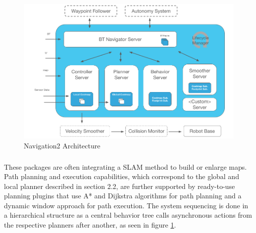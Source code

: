 \begin{figure}[ht]
	\label{fig:nav_architecture}
	\includegraphics[width=1.0\textwidth]{images/nav2_architecture.png}
	\caption{Navigation2 Architecture \cite{macenski2020}}
\end{figure}
\subparagraph*{}
These packages are often integrating a SLAM method to build or enlarge maps. Path planning and execution capabilities, which correspond to the global and local planner described in section 2.2, are further supported by ready-to-use planning plugins that use A* and Dijkstra algorithms for path planning and a dynamic window approach for path execution. The system sequencing is done in a hierarchical structure as a central behavior tree calls asynchronous actions from the respective planners after another, as seen in figure \ref{fig:nav_architecture}. 

